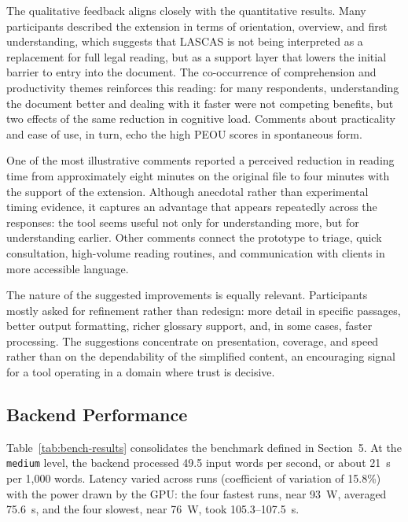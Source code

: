 \documentclass[english]{UNISINOSartigo} %
\begin{document}
The qualitative feedback aligns closely with the quantitative results. Many participants described the extension in terms of orientation, overview, and first understanding, which suggests that LASCAS is not being interpreted as a replacement for full legal reading, but as a support layer that lowers the initial barrier to entry into the document. The co-occurrence of comprehension and productivity themes reinforces this reading: for many respondents, understanding the document better and dealing with it faster were not competing benefits, but two effects of the same reduction in cognitive load. Comments about practicality and ease of use, in turn, echo the high PEOU scores in spontaneous form.

One of the most illustrative comments reported a perceived reduction in reading time from approximately eight minutes on the original file to four minutes with the support of the extension. Although anecdotal rather than experimental timing evidence, it captures an advantage that appears repeatedly across the responses: the tool seems useful not only for understanding more, but for understanding earlier. Other comments connect the prototype to triage, quick consultation, high-volume reading routines, and communication with clients in more accessible language.

The nature of the suggested improvements is equally relevant. Participants mostly asked for refinement rather than redesign: more detail in specific passages, better output formatting, richer glossary support, and, in some cases, faster processing. The suggestions concentrate on presentation, coverage, and speed rather than on the dependability of the simplified content, an encouraging signal for a tool operating in a domain where trust is decisive.

\subsection{Backend Performance}

Table~\ref{tab:bench-results} consolidates the benchmark defined in Section~5. At the \texttt{medium} level, the backend processed 49.5 input words per second, or about 21~s per 1,000 words. Latency varied across runs (coefficient of variation of 15.8\%) with the power drawn by the GPU: the four fastest runs, near 93~W, averaged 75.6~s, and the four slowest, near 76~W, took 105.3--107.5~s.
\end{document}

